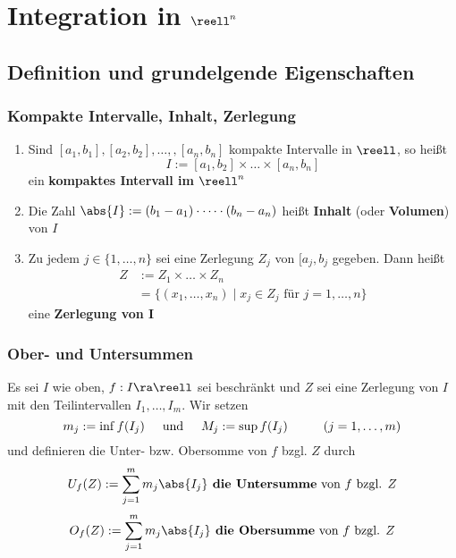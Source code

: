 \documentclass{kit}
\begin{document}
\section{Integration in \texorpdfstring{$\reell^n$}{}}
  \subsection{Definition und grundelgende Eigenschaften}
    \subsubsection{Kompakte Intervalle, Inhalt, Zerlegung}
    \begin{enumerate}
        \item Sind $[a_1,b_1],[a_2,b_2],\dots,,[a_n,b_n]$ kompakte Intervalle in $\reell$, so heißt
          $$I:=[a_1,b_2]\times\dots\times[a_n,b_n]$$
          ein \textbf{kompaktes Intervall im $\reell^n$}
        \item Die Zahl $\abs{I}:=(b_1-a_1)\cdot\dots\cdot(b_n-a_n)$ heißt \textbf{Inhalt} (oder \textbf{Volumen}) von $I$
        \item Zu jedem $j\in\{1,\dots,n\}$ sei eine Zerlegung $Z_j$ von $[a_j,b_j$ gegeben. Dann heißt
          $$\begin{aligned}
            Z & :=Z_1\times\dots\times Z_n\\
              & =\{(x_1,\dots,x_n)\mid x_j\in Z_j\text{ für }j=1,\dots,n\}
          \end{aligned}$$
          eine \textbf{Zerlegung von I}
      \end{enumerate}
    \subsubsection{Ober- und Untersummen}
      Es sei $I$ wie oben, $f:I\ra\reell$ sei beschränkt und $Z$ sei eine Zerlegung von $I$ mit den Teilintervallen 
      $I_1,\dots,I_m$. Wir setzen
      $$m_j:=\inf f(I_j)\hspace{0.5cm}\text{und}\hspace{0.5cm}M_j:=\sup f(I_j)\hspace{1cm}(j=1,\dots,m)$$
      und definieren die Unter- bzw. Obersomme von $f$ bzgl. $Z$ durch
      $$U_f(Z):=\sum^m_{j=1}m_j\abs{I_j}\textbf{ die Untersumme}\text{ von $f$ bzgl. $Z$}$$
      $$O_f(Z):=\sum^m_{j=1}m_j\abs{I_j}\textbf{ die Obersumme}\text{ von $f$ bzgl. $Z$}$$
\end{document}
